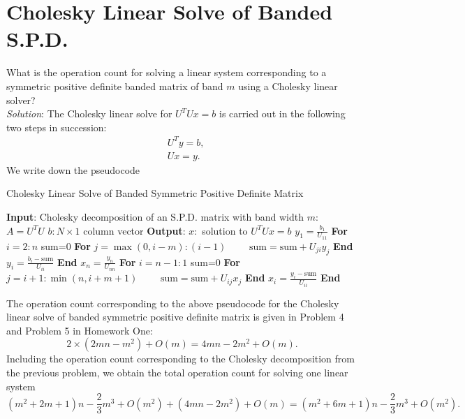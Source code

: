 \documentclass[paper=a4, fontsize=11pt]{scrartcl} %
\numberwithin{equation}{section} %
\numberwithin{figure}{section} %
\numberwithin{table}{section} %
\begin{document}
\section{Cholesky Linear Solve of Banded S.P.D.}
What is the operation count for solving a linear system corresponding to
a symmetric positive definite banded matrix of band $m$ using a Cholesky linear
solver?\\
\textit{Solution}: The Cholesky linear solve for $U^T U x =b$ is carried out in the following two steps in succession:
\begin{align}
\nonumber & U^T y = b,\\
\nonumber & U x = y.
\end{align}
We write down the pseudocode
\begin{algorithm}
\caption{Cholesky Linear Solve of Banded Symmetric Positive Definite Matrix}\label{clsb}
\begin{algorithmic}
\STATE \textbf{Input}:
\STATE \quad Cholesky decomposition of an S.P.D. matrix with band width $m$: $A=U^T U$ 
\STATE \quad $b: N\times 1$ column vector
\STATE \textbf{Output}: $x: $ solution to $U^T U x =b$
\newline
\STATE $y_1 = \frac{b_1}{U_{11}}$
\STATE \textbf{For} $i=2:n$
\STATE \quad sum=0
\STATE \quad \textbf{For} $j=\max(0,i-m):(i-1)$
    \STATE $\quad\quad \text{sum} = \text{sum} + U_{ji}y_{j}$
\STATE \quad \textbf{End}
\STATE \quad $y_i = \frac{b_i-\text{sum}}{U_{ii}}$
\STATE \textbf{End}
\newline
\STATE $x_n =\frac{y_n}{U_{nn}}$
\STATE \textbf{For} $i=n-1:1$
\STATE \quad sum=0
\STATE \quad \textbf{For} $j=i+1:\min(n,i+m+1)$
    \STATE $\quad\quad \text{sum} = \text{sum} + U_{ij}x_{j}$
\STATE \quad \textbf{End}
\STATE \quad $x_i = \frac{y_i - \text{sum}}{U_{ii}}$
\STATE \textbf{End}
\end{algorithmic}
\end{algorithm}
\newline
The operation count corresponding to the above pseudocode for the Cholesky linear solve of banded symmetric positive definite matrix
is given in Problem 4 and Problem 5 in Homework One:
$$
2\times(2mn-m^2)+O(m) = 4mn - 2m^2 +O(m).
$$
Including the operation count corresponding to the Cholesky decomposition from the previous problem, we obtain the total operation count for solving one linear
system
$$
\left(m^2+2m+1\right)n - \frac{2}{3}m^3 +O\left(m^2\right) + \left(4mn - 2m^2\right) + O(m)
 = \left(m^2+6m+1\right)n - \frac{2}{3}m^3 +O\left(m^2\right).
$$
\newpage
\end{document}
